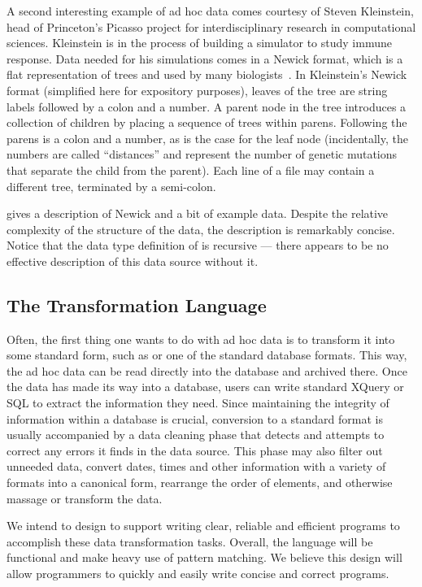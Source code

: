\documentclass[11pt]{article}
\begin{document}
A second interesting example of ad hoc data comes courtesy of
Steven Kleinstein, head of Princeton's Picasso project for
interdisciplinary research in computational sciences.  
Kleinstein is in the process of 
building a simulator to study immune response.  Data
needed for his simulations comes in a Newick format, which is
a flat representation of trees and used by many biologists~\cite{newick}.  
In Kleinstein's Newick format (simplified
here for expository purposes), leaves of the
tree are string labels followed by a colon and a number.
A parent node in the tree introduces a collection of
children by placing a sequence of trees within parens.
Following the parens is a colon and a number, as is the case
for the leaf node (incidentally, the numbers are called ``distances''
and represent the number of genetic mutations that separate the
child from the parent).  Each line of a file may contain
a different tree, terminated by a semi-colon.

 gives a description of Newick
and a bit of example data.
Despite the relative complexity of the structure of the data, 
the description is remarkably concise.
Notice that the data type definition of  is recursive ---
there appears to be no effective description of this data
source without it.  

\subsection{The \datatype{} Transformation Language}

Often, the first thing one wants to do with ad hoc data 
is to transform it into some standard form, such as \xml{}
or one of the standard database formats.  This way,
the ad hoc data can be read directly into the database
and archived there.  Once the data has made its way into a database, 
users can write standard XQuery or SQL to extract the information 
they need.  Since maintaining the integrity of information
within a database is crucial, conversion to a standard format
is usually accompanied by a data cleaning phase that detects
and attempts to correct any errors it finds in the data source.
This phase may also filter out unneeded data, convert dates,
times and other information with a variety of formats into
a canonical form, rearrange the order of elements,
and otherwise massage or transform the data.

We intend to design \datatype{} 
to support writing clear, reliable and efficient programs to
accomplish these data transformation tasks.
Overall, the language will be functional and make
heavy use of pattern matching.  We believe this design will
allow programmers to quickly and easily write concise and correct
programs.  
\end{document}
